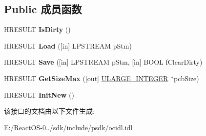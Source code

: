 \subsection*{Public 成员函数}
\begin{DoxyCompactItemize}
\item 
\mbox{\label{interface_i_persist_stream_init_a7c609f1c6a98a26e07be952b9d9f2a4f}} 
H\+R\+E\+S\+U\+LT {\bfseries Is\+Dirty} ()
\item 
\mbox{\label{interface_i_persist_stream_init_a86d9262aa23b207bef3adf668b2f6be6}} 
H\+R\+E\+S\+U\+LT {\bfseries Load} (\mbox{[}in\mbox{]} L\+P\+S\+T\+R\+E\+AM p\+Stm)
\item 
\mbox{\label{interface_i_persist_stream_init_a1fdc59f4941adfc4fc373db9b251dd45}} 
H\+R\+E\+S\+U\+LT {\bfseries Save} (\mbox{[}in\mbox{]} L\+P\+S\+T\+R\+E\+AM p\+Stm, \mbox{[}in\mbox{]} B\+O\+OL f\+Clear\+Dirty)
\item 
\mbox{\label{interface_i_persist_stream_init_aa3702e6e95295acb7f0928ae7b73f30c}} 
H\+R\+E\+S\+U\+LT {\bfseries Get\+Size\+Max} (\mbox{[}out\mbox{]} \hyperlink{struct___u_l_a_r_g_e___i_n_t_e_g_e_r}{U\+L\+A\+R\+G\+E\+\_\+\+I\+N\+T\+E\+G\+ER} $\ast$pcb\+Size)
\item 
\mbox{\label{interface_i_persist_stream_init_a595477993b42bd8463438216c45792c2}} 
H\+R\+E\+S\+U\+LT {\bfseries Init\+New} ()
\end{DoxyCompactItemize}


该接口的文档由以下文件生成\+:\begin{DoxyCompactItemize}
\item 
E\+:/\+React\+O\+S-\/0../sdk/include/psdk/ocidl.\+idl\end{DoxyCompactItemize}
